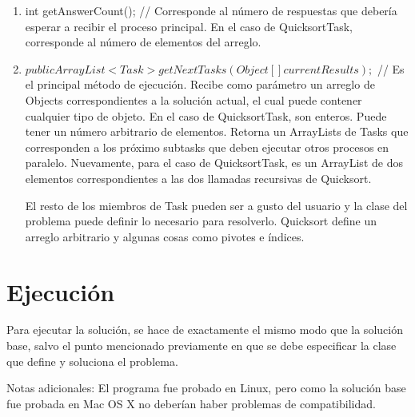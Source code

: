 \documentclass[12pt,spanish]{article}
\begin{document}
	\begin{enumerate}
		\item int getAnswerCount(); // Corresponde al número de respuestas que debería esperar a recibir el proceso principal. En el caso de QuicksortTask, corresponde al número de elementos del arreglo.
		\item $public ArrayList<Task> getNextTasks(Object[] currentResults);$ // Es el principal método de ejecución. Recibe como parámetro un arreglo de Objects correspondientes a la solución actual, el cual puede contener cualquier tipo de objeto. En el caso de QuicksortTask, son enteros. Puede tener un número arbitrario de elementos. 
		Retorna un ArrayLists de Tasks que corresponden a los próximo subtasks que deben ejecutar otros procesos en paralelo. Nuevamente, para el caso de QuicksortTask, es un ArrayList de dos elementos correspondientes a las dos llamadas recursivas de Quicksort. 

		El resto de los miembros de Task pueden ser a gusto del usuario y la clase del problema puede definir lo necesario para resolverlo. Quicksort define un arreglo arbitrario y algunas cosas como pivotes e índices.
	\end{enumerate}

	\section{Ejecución}

	Para ejecutar la solución, se hace de exactamente el mismo modo que la solución base, salvo el punto mencionado previamente en que se debe especificar la clase que define y soluciona el problema.

	Notas adicionales: El programa fue probado en Linux, pero como la solución base fue probada en Mac OS X no deberían haber problemas de compatibilidad.
\end{document}
